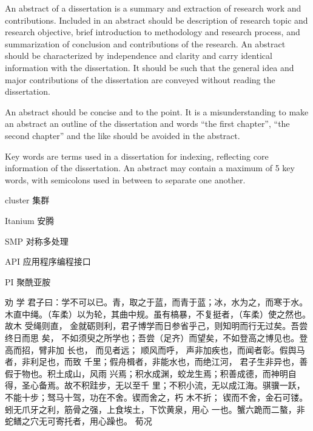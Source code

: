 \documentclass[bachelor,zhspacing]{cqu}  %
\begin{document}
\begin{enabstract}
     An abstract of a dissertation is a summary and extraction of 
research work and contributions. Included in an abstract should be 
description of research topic and research objective, brief 
introduction to methodology and research process, and summarization 
of conclusion and contributions of the research. An abstract should be 
characterized by independence and clarity and carry identical 
information with the dissertation. It should be such that the general 
idea and major contributions of the dissertation are conveyed
without reading the dissertation.\par
     An abstract should be concise and to the point. It is a 
misunderstanding to make an abstract an outline of the dissertation and 
words “the first chapter”, “the second chapter” and the like should be 
avoided in the abstract.\par
     Key words are terms used in a dissertation for indexing, 
reflecting core information of the dissertation. An abstract may 
contain a maximum of 5 key words, with semicolons used in between to 
separate one another.
\end{enabstract}

\tableofcontents
\listoffigures
\listoftables


\begin{denotation}{2.5}{0}

\item[cluster] 集群
\item[Itanium] 安腾
\item[SMP] 对称多处理
\item[API] 应用程序编程接口
\item[PI]   聚酰亚胺
\item[劝  学] 君子曰：学不可以已。青，取之于蓝，而青于蓝；冰，水为之，而寒于水。
  木直中绳。（车柔）以为轮，其曲中规。虽有槁暴，不复挺者，（车柔）使之然也。故木
  受绳则直， 金就砺则利，君子博学而日参省乎己，则知明而行无过矣。吾尝终日而思
  矣，  不如须臾之所学也；吾尝（足齐）而望矣，不如登高之博见也。登高而招，臂非加
  长也，  而见者远；  顺风而呼，  声非加疾也，而闻者彰。假舆马者，非利足也，而致
  千里；假舟楫者，非能水也，而绝江河，  君子生非异也，善假于物也。积土成山，风雨
  兴焉；积水成渊，蛟龙生焉；积善成德，而神明自得，圣心备焉。故不积跬步，无以至千
  里；不积小流，无以成江海。骐骥一跃，不能十步；驽马十驾，功在不舍。锲而舍之，朽
  木不折；  锲而不舍，金石可镂。蚓无爪牙之利，筋骨之强，上食埃土，下饮黄泉，用心
  一也。蟹六跪而二螯，非蛇鳝之穴无可寄托者，用心躁也。\pozhehao{} 荀况
\end{denotation}
\end{document}
